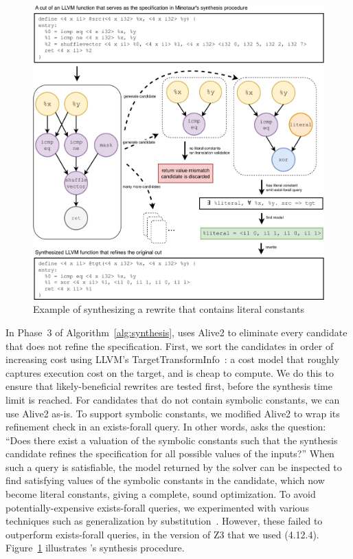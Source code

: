 \begin {figure}[tbp]
  \centering
  \includegraphics[width=0.8\linewidth]{figures/solve_literal.pdf}
  \caption{Example of synthesizing a rewrite that contains literal constants}
  \label{fig:synthesizing}
\end{figure}

In Phase~3 of Algorithm~\ref{alg:synthesis}, \minotaur{} uses Alive2 to
eliminate every candidate that does not refine the specification.
%
First, we sort the candidates in order of increasing cost using LLVM's
TargetTransformInfo~\cite{tti}: a cost model that roughly captures
execution cost on the target, and is cheap to compute.
%
We do this to ensure that likely-beneficial rewrites are tested first,
before the synthesis time limit is reached.
%
For candidates that do not contain symbolic constants, we can use
Alive2 as-is.
%
To support symbolic constants, we modified Alive2 to wrap
its refinement check in an exists-forall query.
%
In other words, \minotaur{} asks the question: ``Does there exist a
valuation of the symbolic constants such that the synthesis candidate
refines the specification for all possible values of the inputs?''
%
When such a query is satisfiable, the model returned by the solver can
be inspected to find satisfying values of the symbolic constants
in the candidate, which now become literal constants, giving a
complete, sound optimization.
%
To avoid potentially-expensive exists-forall queries, we experimented
with various techniques such as generalization by
substitution~\cite{Dutertre15}.
%
However, these failed to outperform exists-forall queries, in the
version of Z3 that we used (4.12.4).
%
Figure~\ref{fig:synthesizing} illustrates \minotaur's synthesis procedure.


